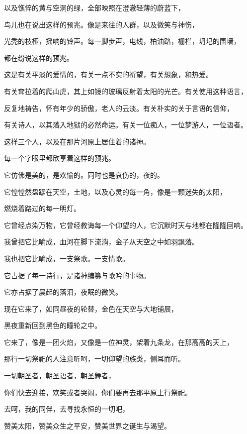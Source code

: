 \documentclass[UTF8]{article}
\begin{document}
\par 以及憔悴的黄与空洞的绿，全部映照在澄澈轻薄的蔚蓝下，
\par 鸟儿也在说出这样的预兆。像是来往的人群，以及微笑与神伤，
\par 光秃的枝桠，摇响的铃声。每一脚步声，电线，柏油路，栅栏，坍圮的围墙，
\par 都在纷说这样的预兆。
\\[0.6cm]
\par 这是有关平淡的爱情的，有关一点不实的祈望，有关想象，和热爱。
\par 有关耷拉着的爬山虎，其上如镜的玻璃反射着太阳的光芒。有关使用这种语言，
\par 反复地祷告，怀有年少的骄傲，老人的云淡。有关朴实的关于言语的信仰，
\par 有关诗人，以其落入地狱的必然命运。有关一位痴人，一位梦游人，一位语者。
\par 这样三个人，以及在那片河原上居住着的诸神。
\par 每一个字眼里都欣享着这样的预兆。
\\[0.6cm]
\par 它仿佛是美的，是欢愉的。同时也是哀伤的，夜的。
\par 它惶惶然盘踞在天空，土地，以及心灵的每一角，像是一颗迷失的太阳，
\par 燃烧着路过的每一明灯。
\par 它曾经点染万物，它曾经教诲每一个仰望的人，它沉默时天与地都在隆隆回响。
\par 我曾把它比喻成，血河在脚下流淌，金子从天空之中如羽飘落。
\par 我也把它比喻成，一支祭歌。一支情歌。
\par 它占据了每一诗行，是诸神编纂与歌吟的事物。
\par 它亦占据了晨起的落泪，夜眠的微笑。
\\[0.6cm]
\par 现在它来了，如同昼夜的轮替，金色在天空与大地铺展，
\par 黑夜重新回到黑色的瞳轮之中。
\par 它来了，像是一团火焰，又像是一位神灵，架着九条龙，在那高高的天上，
\par 那行一切祭祀的人注意听呵，一切仰望的族类，侧耳而听。
\par 一切朝圣者，朝圣语者，朝圣舞者，
\par 你们快去迎接，欢笑或者哭闹，你们要再去那平原上行祭祀。
\par 去呵，我的同伴，去寻找永恒的一切吧，
\par 赞美太阳，赞美众生之平安，赞美世界之诞生与渴望。
\end{document}
